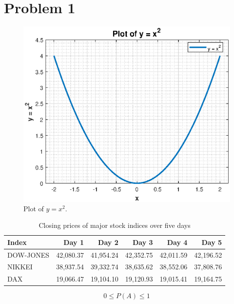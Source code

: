 \documentclass[12pt]{report}
\begin{document}


\section*{Problem 1}


\begin{figure}[H]
    \centering
    \includegraphics[width=0.75\linewidth]{y=x^2.eps}
    \caption{Plot of $y = x^2$.}
\end{figure}

\begin{table}[H]
\centering
\label{tab:closing_prices_updated}
\begin{tabularx}{\textwidth}{Xrrrrr}
    \toprule
    \textbf{Index}     & \textbf{Day 1} & \textbf{Day 2} & \textbf{Day 3} & \textbf{Day 4} & \textbf{Day 5} \\
    \midrule
    DOW-JONES  & 42,080.37 & 41,954.24 & 42,352.75 & 42,011.59 & 42,196.52 \\
    NIKKEI     & 38,937.54 & 39,332.74 & 38,635.62 & 38,552.06 & 37,808.76 \\
    DAX        & 19,066.47 & 19,104.10 & 19,120.93 & 19,015.41 & 19,164.75 \\
    \bottomrule
\end{tabularx}
\caption{Closing prices of major stock indices over five days}
\end{table}




\begin{equation}
0 \leq P(A) \leq 1
\end{equation}
\end{document}
